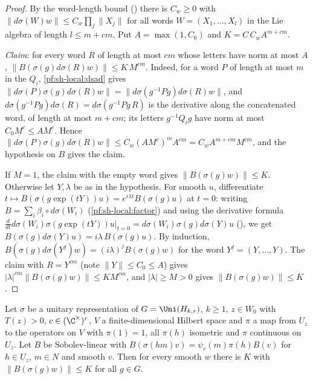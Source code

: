 \begin{proof}
By the word-length bound () there is $C_w\ge0$ with
$\|d\sigma(W)w\|\le C_w\prod_j\|X_j\|$ for all words $W=(X_1,\dots,X_l)$ in the Lie algebra of length
$l\le m+cm$. Put $A=\max(1,C_0)$ and $K=C\,C_wA^{m+cm}$.

\emph{Claim}: for every word $R$ of length at most $cm$ whose letters have norm at most $A$,
$\|B(\sigma(g)d\sigma(R)w)\|\le K\,M^{cm}$. Indeed, for a word $P$ of length at most $m$ in the $Q_i$,
\cref{pf:sh-local:dsad} gives $\|d\sigma(P)\sigma(g)d\sigma(R)w\|=\|d\sigma(g^{-1}Pg)d\sigma(R)w\|$, and
$d\sigma(g^{-1}Pg)d\sigma(R)=d\sigma(g^{-1}Pg\,R)$ is the derivative along the concatenated word, of length at most
$m+cm$; its letters $g^{-1}Q_ig$ have norm at most $C_0M^c\le AM^c$. Hence
$\|d\sigma(P)\sigma(g)d\sigma(R)w\|\le C_w(AM^c)^mA^{cm}=C_wA^{m+cm}M^{cm}$, and the hypothesis on $B$ gives the claim.

If $M=1$, the claim with the empty word gives $\|B(\sigma(g)w)\|\le K$. Otherwise let $Y,\lambda$ be as in the
hypothesis. For smooth $u$, differentiate $t\mapsto B(\sigma(g\exp(tY))u)=e^{i\lambda t}B(\sigma(g)u)$ at $t=0$:
writing $B=\sum_i\beta_i\circ d\sigma(W_i)$ (\cref{pf:sh-local:factor}) and using the derivative formula
$\frac d{dt}d\sigma(W_i)\sigma(g\exp(tY))u|_{t=0}=d\sigma(W_i)\sigma(g)d\sigma(Y)u$
(), we get $B(\sigma(g)d\sigma(Y)u)=i\lambda\,B(\sigma(g)u)$. By
induction, $B(\sigma(g)d\sigma(Y^{j})w)=(i\lambda)^jB(\sigma(g)w)$ for the word $Y^j=(Y,\dots,Y)$. The claim with
$R=Y^{cm}$ (note $\|Y\|\le C_0\le A$) gives $|\lambda|^{cm}\|B(\sigma(g)w)\|\le KM^{cm}$, and $|\lambda|\ge M>0$ gives
$\|B(\sigma(g)w)\|\le K$.
\end{proof}

\begin{theorem}\label{pf:sh-local:bounded}
Let $\sigma$ be a unitary representation of $G=\Uni(H_{k,r})$, $k\ge1$, $z\in W_0$ with $T(z)>0$,
$c\in(\C^\times)^r$, $V$ a finite-dimensional Hilbert space and $\pi$ a map from $U_z$ to the operators on $V$ with
$\pi(1)=1$, all $\pi(h)$ isometric and $\pi$ continuous on $U_z$. Let $B$ be Sobolev-linear with
$B(\sigma(hm)v)=\psi_c(m)\pi(h)B(v)$ for $h\in U_z$, $m\in N$ and smooth $v$. Then for every smooth $w$ there is
$K$ with $\|B(\sigma(g)w)\|\le K$ for all $g\in G$.
\end{theorem}

